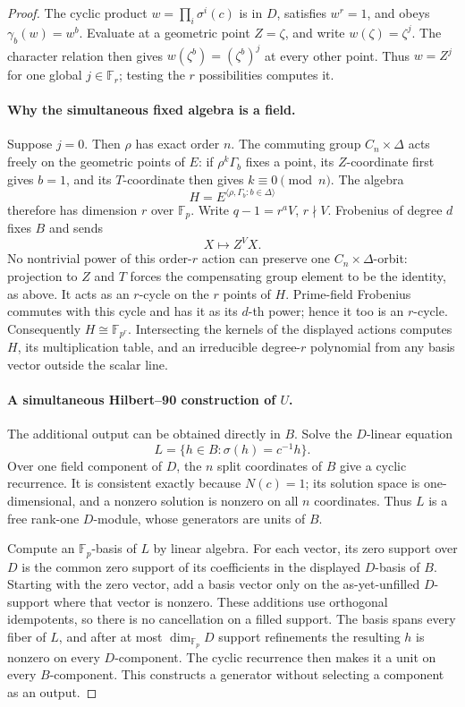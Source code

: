 \documentclass[11pt]{article}
\theoremstyle{definition}
\theoremstyle{remark}
\begin{document}
\begin{proof}
The cyclic product \(w=\prod_i\sigma^i(c)\) is in \(D\),
satisfies \(w^r=1\), and obeys \(\gamma_b(w)=w^b\).
Evaluate at a geometric point \(Z=\zeta\), and write
\(w(\zeta)=\zeta^j\).  The character relation then gives
\(w(\zeta^b)=(\zeta^b)^j\) at every other point.
Thus \(w=Z^j\) for one global \(j\in\mathbb F_r\);
testing the \(r\) possibilities computes it.

\paragraph{Why the simultaneous fixed algebra is a field.}
Suppose \(j=0\).  Then \(\rho\) has exact order \(n\).
The commuting group \(C_n\times\Delta\) acts freely on the
geometric points of \(E\): if \(\rho^k\Gamma_b\) fixes a point,
its \(Z\)-coordinate first gives \(b=1\), and its \(T\)-coordinate
then gives \(k\equiv0\pmod n\).
The algebra
\[
                   H=E^{\langle\rho,\Gamma_b:b\in\Delta\rangle}
\]
therefore has dimension \(r\) over \(\mathbb F_p\).
Write \(q-1=r^aV\), \(r\nmid V\).
Frobenius of degree \(d\) fixes \(B\) and sends
\[
                            X\longmapsto Z^V X.
\]
No nontrivial power of this order-\(r\) action can preserve one
\(C_n\times\Delta\)-orbit: projection to \(Z\) and \(T\) forces
the compensating group element to be the identity, as above.
It acts as an \(r\)-cycle on the \(r\) points of \(H\).
Prime-field Frobenius commutes with this cycle and has it as
its \(d\)-th power; hence it too is an \(r\)-cycle.
Consequently \(H\cong\mathbb F_{p^r}\).
Intersecting the kernels of the displayed actions computes \(H\),
its multiplication table, and an irreducible degree-\(r\) polynomial
from any basis vector outside the scalar line.

\paragraph{A simultaneous Hilbert--90 construction of \(U\).}
The additional output can be obtained directly in \(B\).
Solve the \(D\)-linear equation
\[
                 L=\{h\in B:\sigma(h)=c^{-1}h\}.
\]
Over one field component of \(D\), the \(n\) split coordinates
of \(B\) give a cyclic recurrence.
It is consistent exactly because \(N(c)=1\);
its solution space is one-dimensional, and a nonzero solution
is nonzero on all \(n\) coordinates.
Thus \(L\) is a free rank-one \(D\)-module, whose generators
are units of \(B\).

Compute an \(\mathbb F_p\)-basis of \(L\) by linear algebra.
For each vector, its zero support over \(D\) is the common zero
support of its coefficients in the displayed \(D\)-basis of \(B\).
Starting with the zero vector, add a basis vector only on the
as-yet-unfilled \(D\)-support where that vector is nonzero.
These additions use orthogonal idempotents, so there is no
cancellation on a filled support.
The basis spans every fiber of \(L\), and after at most
\(\dim_{\mathbb F_p}D\) support refinements the resulting
\(h\) is nonzero on every \(D\)-component.
The cyclic recurrence then makes it a unit on every
\(B\)-component.  This constructs a generator without selecting
a component as an output.


\end{proof}
\end{document}
